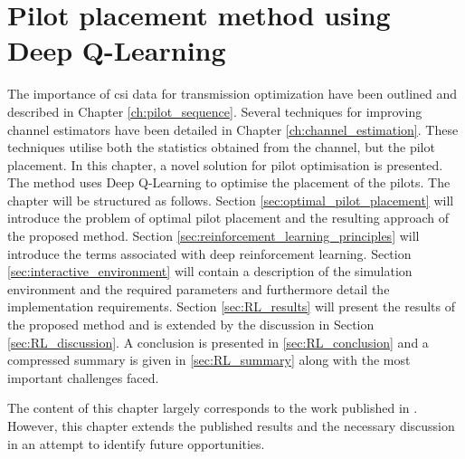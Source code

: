 \chapter{Pilot placement method using Deep Q-Learning}\label{ch:channel_q_learning}


The importance of \gls{csi} data for transmission optimization have been outlined and described in Chapter \ref{ch:pilot_sequence}. Several techniques for improving channel estimators have been detailed in Chapter \ref{ch:channel_estimation}. These techniques utilise both the statistics obtained from the channel, but the pilot placement. In this chapter, a novel solution for pilot optimisation is presented. The method uses Deep Q-Learning to optimise the placement of the pilots. The chapter will be structured as follows. Section \ref{sec:optimal_pilot_placement} will introduce the problem of optimal pilot placement and the resulting approach of the proposed method. Section \ref{sec:reinforcement_learning_principles} will introduce the terms associated with deep reinforcement learning. Section \ref{sec:interactive_environment} will contain a description of the simulation environment and the required parameters and furthermore detail the implementation requirements.  Section \ref{sec:RL_results} will present the results of the proposed method and is extended by the discussion in Section \ref{sec:RL_discussion}. A conclusion is presented in \ref{sec:RL_conclusion} and a compressed summary is given in \ref{sec:RL_summary} along with the most important challenges faced.

The content of this chapter largely corresponds to the work published in \cite{Thrane2020PilotQ-Learning}. However, this chapter extends the published results and the necessary discussion in an attempt to identify future opportunities. 





